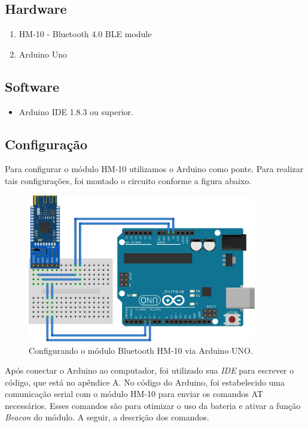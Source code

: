\documentclass[
	12pt,				%
	oneside,			%
	a4paper,			%
	brazil				%
]{abntex2}
\begin{document}
{\subsection{Hardware}

\begin{enumerate}
\item HM-10 - Bluetooth 4.0 BLE module
\item Arduino Uno
\end{enumerate}

\subsection{Software}

\begin{itemize}
\item Arduino IDE 1.8.3 ou superior. 
\end{itemize}

\subsection{Configuração}

Para configurar o módulo HM-10 utilizamos o Arduino como ponte. Para realizar tais configurações, foi montado o circuito conforme a figura abaixo.

\begin{figure}[!h]
\centering
\includegraphics[width=10cm, center]{images/arduino-hm10}
\caption{Configurando o módulo Bluetooth HM-10 via Arduino UNO.}
\label{Rotulo}
\end{figure}

Após conectar o Arduino ao computador, foi utilizado sua \textit{IDE} para escrever o código, que está no apêndice A. No código do Arduino, foi estabelecido uma comunicação serial com o módulo HM-10 para enviar os comandos AT necessários. Esses comandos são para otimizar o uso da bateria e ativar a função \textit{Beacon} do módulo. A seguir, a descrição dos comandos.

}
\end{document}
